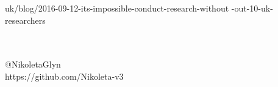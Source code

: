 \documentclass{beamer}
\theoremstyle{definition}
\begin{document}
\begin{frame}
\begin{center}
\small{uk/blog/2016-09-12-its-impossible-conduct-research-without%
-out-10-uk-researchers}
\end{center}
\end{frame}

\begin{frame}
\begin{center}
\end{center}
\end{frame}

\begin{frame}
\begin{center}
\end{center}
\end{frame}

\begin{frame}
\begin{center}
\end{center}
\end{frame}

\begin{frame}
\begin{center}
\end{center}
\end{frame}

\begin{frame}
\begin{center}
\end{center}
\end{frame}

\begin{frame}
	\begin{center}
		\huge{\textbf{}}\\~\\
		\small{@NikoletaGlyn}\\
		\small{https://github.com/Nikoleta-v3}\\
	\end{center}
\end{frame}
\end{document}
